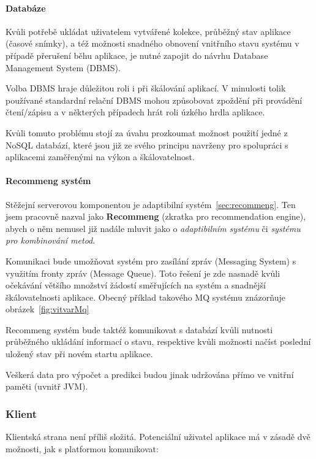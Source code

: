 \documentclass[thesis=M,czech]{FITthesis}[2014/05/07]
\begin{document}
\paragraph{Databáze}

Kvůli potřebě ukládat uživatelem vytvářené kolekce, průběžný stav aplikace (časové snímky), a též možnosti snadného obnovení vnitřního stavu systému v případě přerušení běhu aplikace, je nutné zapojit do návrhu Database Management System (DBMS).

Volba DBMS hraje důležitou roli i při škálování aplikací. V minulosti tolik používané standardní relační DBMS mohou způsobovat zpoždění při provádění čtení/zápisu a v některých případech hrát roli úzkého hrdla aplikace.

Kvůli tomuto problému stojí za úvahu prozkoumat možnost použití jedné z NoSQL databází, které jsou již ze svého principu navrženy pro spolupráci s aplikacemi zaměřenými na výkon a škálovatelnost.

\paragraph{Recommeng systém}

Stěžejní serverovou komponentou je adaptibilní systém~\ref{sec:recommeng}. Ten jsem pracovně nazval jako \textbf{Recommeng} (zkratka pro recommendation engine), abych o něm nemusel již nadále mluvit jako o \emph{adaptibilním systému} či \emph{systému pro kombinování metod}. 

Komunikaci bude umožňovat systém pro zasílání zpráv (Messaging System) s využitím fronty zpráv (Message Queue). Toto řešení je zde nasnadě kvůli očekávání většího množství žádostí směřujících na systém a snadnější škálovatelnosti aplikace. Obecný příklad takového MQ systému znázorňuje obrázek~\ref{fig:vitvarMq}

Recommeng systém bude taktéž komunikovat s databází kvůli nutnosti průběžného ukládání informací o stavu, respektive kvůli možnosti načíst poslední uložený stav při novém startu aplikace.

Veškerá data pro výpočet a predikci budou jinak udržována přímo ve vnitřní paměti (uvnitř JVM).

\subsubsection{Klient}

Klientská strana není příliš složitá. Potenciální uživatel aplikace má v zásadě dvě možnosti, jak s platformou komunikovat:
\end{document}
